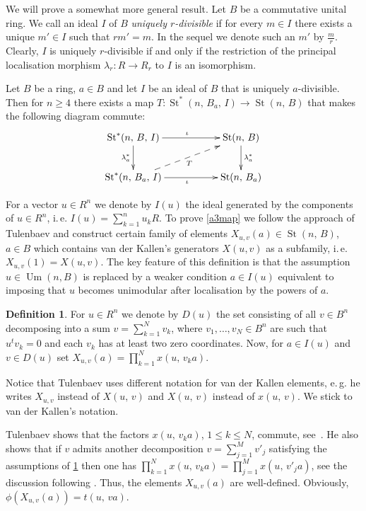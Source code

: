 \documentclass[11pt]{amsart}
\theoremstyle{plain} \declaretheorem[name=Theorem, Refname={Theorem,Theorems}]{tm} \Crefname{tm}{Theorem}{Theorems}
\numberwithin{equation}{section}
\theoremstyle{definition} \newtheorem{df}[lm]{Definition} \Crefname{df}{Definition}{Definitions}
\theoremstyle{remark} \newtheorem{rk}[lm]{Remark} \Crefname{rk}{Remark}{Remarks}
\newcommand{\Um}{\mathop{\mathrm{Um}}\nolimits}
\newcommand{\St}{\mathop{\mathrm{St}}\nolimits}
\begin{document}
We will prove a somewhat more general result. Let $B$ be a commutative unital ring.
We call an ideal $I$ of $B$ \emph{uniquely $r$-divisible} if for every $m\in I$ there exists a unique $m'\in I$ such that $rm' = m$.
In the sequel we denote such an $m'$ by $\frac{m}{r}$.
Clearly, $I$ is uniquely $r$-divisible if and only if the restriction of the principal localisation morphism $\lambda_r\colon R \to R_r$ to $I$ is an isomorphism.

\begin{tm} \label{a3map} Let $B$ be a ring, $a\in B$ and let $I$ be an ideal of $B$ that is uniquely $a$-divisible.
Then for $n\geq 4$ there exists a map $T\colon\St^*(n,\,B_a,\,I)\rightarrow\St(n,\,B)$ that makes the following diagram commute:
\begin{equation} \xymatrix{ \St^*(n,\,B,\,I)\ar@<-0.0ex>[rr]^{\iota}\ar@<-0.0ex>[d]_{\lambda_{a}^*} && \St(n,\,B)\ar@<-0.0ex>[d]^{\lambda_{a}^*}\\
                            \St^*(n,\,B_a,\,I)\ar@<-0.0ex>[rr]_{\iota}\ar@{-->}[rru]_{T}            && \St(n,\,B_a)} \label{eq:a3diag} \end{equation} \end{tm}

For a vector $u\in R^n$ we denote by $I(u)$ the ideal generated by the components of $u\in R^n$, i.\,e. $I(u)=\sum\limits_{k=1}^nu_kR$.
To prove \cref{a3map} we follow the approach of Tulenbaev and construct certain family of elements $X_{u,v}(a)\in \St(n,\,B)$, $a\in B$ which contains van der Kallen's generators $X(u, v)$ as a subfamily, i.\,e. $X_{u,v}(1) = X(u, v)$.
The key feature of this definition is that the assumption $u \in\Um(n, B)$ is replaced by a weaker condition $a \in I(u)$ equivalent to imposing that $u$ becomes unimodular after localisation by the powers of $a$.

\setcounter{df}{1}
\begin{df} \label{df:TulX}
For $u \in R^n$ we denote by $D(u)$ the set consisting of all $v\in B^n$ decomposing into a sum $v=\sum_{k=1}^Nv_k$, where $v_1,\ldots,v_N\in B^n$ are such that $u^tv_k=0$ and each $v_k$ has at least two zero coordinates.
Now, for $a\in I(u)$ and $v \in D(u)$ set $X_{u,v}(a) = \prod\limits_{k=1}^Nx(u,\,v_ka)$.
\end{df}
Notice that Tulenbaev uses different notation for van der Kallen elements, e.\,g. he writes $X_{u,v}$ instead of $X(u,\,v)$ and $X(u,\,v)$ instead of $x(u,\,v)$. 
We stick to van der Kallen's notation.

Tulenbaev shows that the factors $x(u,\,v_ka)$, $1\leq k\leq N$, commute, see~\cite[Lemma~1.1\,e)]{Tul}.
He also shows that if $v$ admits another decomposition $v=\sum_{j=1}^Mv'_j$ satisfying the assumptions of \cref{df:TulX} then one has
$\prod_{k=1}^Nx(u,\,v_ka)=\prod_{j=1}^Mx(u,\,v'_ja)$, see the discussion following \cite[Lemma~1.1]{Tul}.
Thus, the elements $X_{u,v}(a)$ are well-defined. Obviously, $\phi(X_{u,v}(a))=t(u,\,va)$.
\end{document}
